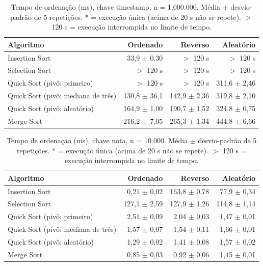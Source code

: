 \begin{table}[ht]
\centering
\caption{Tempo de ordena\c{c}\~ao (ms), chave timestamp, n = 1.000.000. M\'edia $\pm$ desvio-padr\~ao de 5 repeti\c{c}\~oes. * = execu\c{c}\~ao \'unica (acima de 20 s n\~ao se repete). $>$ 120 s = execu\c{c}\~ao interrompida no limite de tempo. }
\label{tab:tempo-timestamp-1000000}
\begin{tabular}{lrrr}
\hline
Algoritmo & Ordenado & Reverso & Aleat\'orio \\
\hline
Insertion Sort & 33,9 $\pm$ 0,30 & $>$ 120 s & $>$ 120 s \\
Selection Sort & $>$ 120 s & $>$ 120 s & $>$ 120 s \\
Quick Sort (piv\^o: primeiro) & $>$ 120 s & $>$ 120 s & 311,6 $\pm$ 2,46 \\
Quick Sort (piv\^o: mediana de tr\^es) & 130,8 $\pm$ 36,1 & 142,9 $\pm$ 2,36 & 319,8 $\pm$ 2,10 \\
Quick Sort (piv\^o: aleat\'orio) & 164,9 $\pm$ 1,00 & 190,7 $\pm$ 1,52 & 324,8 $\pm$ 0,75 \\
Merge Sort & 216,2 $\pm$ 7,05 & 265,3 $\pm$ 1,34 & 444,8 $\pm$ 6,66 \\
\hline
\end{tabular}
\end{table}

\begin{table}[ht]
\centering
\caption{Tempo de ordena\c{c}\~ao (ms), chave nota, n = 10.000. M\'edia $\pm$ desvio-padr\~ao de 5 repeti\c{c}\~oes. * = execu\c{c}\~ao \'unica (acima de 20 s n\~ao se repete). $>$ 120 s = execu\c{c}\~ao interrompida no limite de tempo. }
\label{tab:tempo-nota-10000}
\begin{tabular}{lrrr}
\hline
Algoritmo & Ordenado & Reverso & Aleat\'orio \\
\hline
Insertion Sort & 0,21 $\pm$ 0,02 & 163,8 $\pm$ 0,78 & 77,9 $\pm$ 0,34 \\
Selection Sort & 127,1 $\pm$ 2,59 & 127,9 $\pm$ 1,26 & 114,8 $\pm$ 1,14 \\
Quick Sort (piv\^o: primeiro) & 2,51 $\pm$ 0,09 & 2,04 $\pm$ 0,03 & 1,47 $\pm$ 0,01 \\
Quick Sort (piv\^o: mediana de tr\^es) & 1,57 $\pm$ 0,07 & 1,54 $\pm$ 0,11 & 1,66 $\pm$ 0,01 \\
Quick Sort (piv\^o: aleat\'orio) & 1,29 $\pm$ 0,02 & 1,41 $\pm$ 0,08 & 1,57 $\pm$ 0,02 \\
Merge Sort & 0,85 $\pm$ 0,03 & 0,92 $\pm$ 0,06 & 1,45 $\pm$ 0,01 \\
\hline
\end{tabular}
\end{table}

